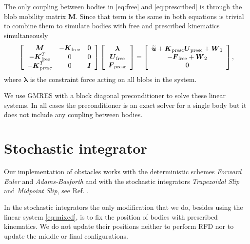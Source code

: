 \documentclass[a4paper,12pt,twoside]{revtex4}
\newcommand{\eqn}{\begin{eqnarray}}
\newcommand{\eqnend}{\end{eqnarray}}
\newcommand{\bs}[1]{\boldsymbol{#1}}
\newcommand{\wtil}[1]{\widetilde{#1}}
\newcommand{\tex}[1]{\mbox{\scriptsize{#1}}}
\def\bF{\bs{F}}
\def\bI{\bs{I}}
\def\bK{\bs{K}}
\def\bM{\bs{M}}
\def\bu{\bs{u}}
\def\bU{\bs{U}}
\def\bW{\bs{W}}
\def\blambda{\bs{\lambda}}
\begin{document}
The only coupling between bodies in \eqref{eq:free} and \eqref{eq:prescribed} is through the blob mobility matrix $\bM$. Since that term is the same in both equations is trivial to combine them to simulate bodies with free and prescribed kinematics simultaneously
\eqn
\left[ \begin{array}{ccc}
\bM & -\bK_{\tex{free}} & 0 \\
-\bK_{\tex{free}}^T & 0 & 0 \\
-\bK^T_{\tex{presc}} & 0 & \bI
\end{array}\right] 
\left[ \begin{array}{c}
\blambda \\
\bU_{\tex{free}} \\
\bF_{\tex{presc}}
\end{array}\right] = 
\left[ \begin{array}{c}
\wtil{\bu} + \bK_{\tex{presc}}\bU_{\tex{presc}} + \bW_1 \\
-\bF_{\tex{free}} + \bW_2 \\
0
\end{array}\right],
\label{eq:mixed}
\eqnend
where $\blambda$ is the constraint force acting on all blobs in the system.

We use GMRES with a block diagonal preconditioner to solve these linear systems.
In all cases the preconditioner is an exact solver for a single body but it does not include any coupling between bodies.


\section{Stochastic integrator}
Our implementation of obstacles works with the deterministic schemes \emph{Forward Euler} and \emph{Adams-Basforth} and with the stochastic integrators \emph{Trapezoidal Slip} and \emph{Midpoint Slip}, see Ref. \cite{Sprinkle2017}.

In the stochastic integrators the only modification that we do, besides using the linear system \eqref{eq:mixed}, is to fix the position of bodies with prescribed kinematics. We do not update their positions 
neither to perform RFD nor to update the middle or final configurations.
\end{document}
